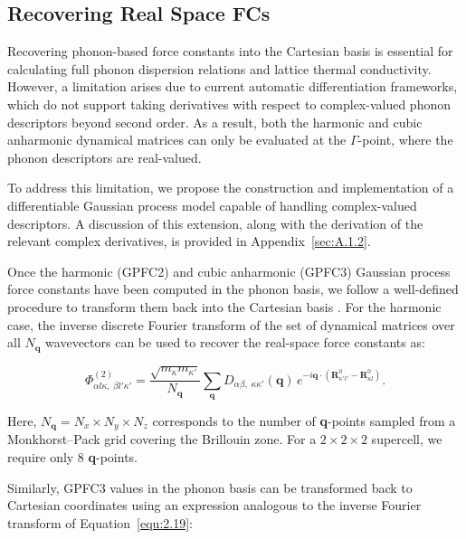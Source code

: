 \subsection{Recovering Real Space FCs} \label{subsec:3.2.3}

Recovering phonon-based force constants into the Cartesian basis is essential for calculating full phonon dispersion relations and lattice thermal conductivity. However, a limitation arises due to current automatic differentiation frameworks, which do not support taking derivatives with respect to complex-valued phonon descriptors beyond second order. As a result, both the harmonic and cubic anharmonic dynamical matrices can only be evaluated at the $\Gamma$-point, where the phonon descriptors are real-valued.

To address this limitation, we propose the construction and implementation of a differentiable Gaussian process model capable of handling complex-valued descriptors. A discussion of this extension, along with the derivation of the relevant complex derivatives, is provided in Appendix~\ref{sec:A.1.2}.

Once the harmonic (GPFC2) and cubic anharmonic (GPFC3) Gaussian process force constants have been computed in the phonon basis, we follow a well-defined procedure to transform them back into the Cartesian basis \cite{phonopy, Togo2015-qf, Phonopy_toolkit}. For the harmonic case, the inverse discrete Fourier transform of the set of dynamical matrices over all $N_{\mathbf{q}}$ wavevectors can be used to recover the real-space force constants as:

\begin{equation}
\label{equ:3.20}
    \Phi^{(2)}_{\alpha l \kappa,\;\beta l' \kappa'} = 
    \frac{ \sqrt{m_{\kappa} m_{\kappa'}} }{N_{\mathbf{q}}}
    \sum_{\mathbf{q}} 
    D_{\alpha \beta,\; \kappa \kappa'}(\mathbf{q}) \,
    e^{-i \mathbf{q} \cdot \left( \mathbf{R}^{0}_{\kappa' l'} - \mathbf{R}^{0}_{\kappa l} \right)}.
\end{equation}

Here, \( N_{\mathbf{q}} = N_x \times N_y \times N_z \) corresponds to the number of \textbf{q}-points sampled from a Monkhorst–Pack grid covering the Brillouin zone. For a \( 2 \times 2 \times 2 \) supercell, we require only 8 \textbf{q}-points.

Similarly, GPFC3 values in the phonon basis can be transformed back to Cartesian coordinates using an expression analogous to the inverse Fourier transform of Equation~\eqref{equ:2.19}:


